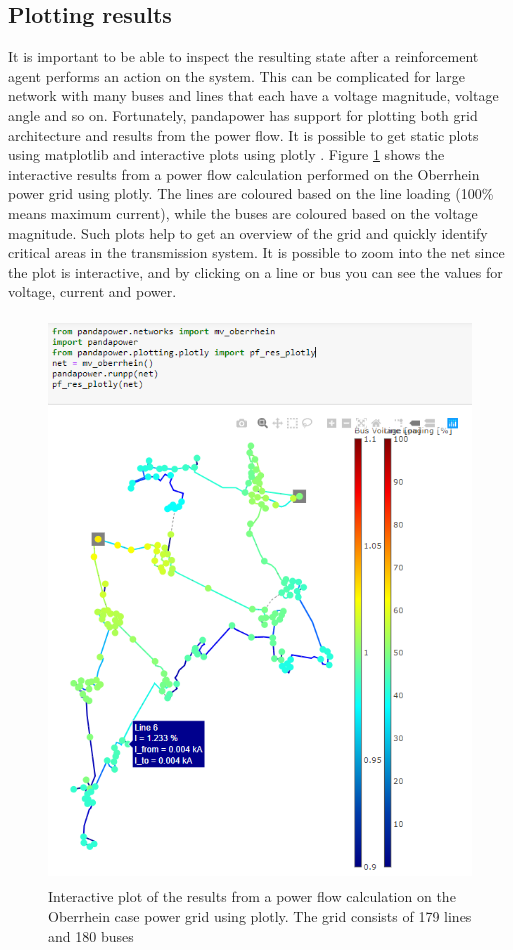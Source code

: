 \documentclass[class=book, crop=false, 11pt]{standalone}
\begin{document}
\subsection{Plotting results}
It is important to be able to inspect the resulting state after a reinforcement agent performs an action on the system. This can be complicated for large network with many buses and lines that each have a voltage magnitude, voltage angle and so on. Fortunately, pandapower has support for plotting both grid architecture and results from the power flow. It is possible to get static plots using matplotlib and interactive plots using plotly \cite{plotly}. Figure \ref{fig:method:oberrhein_grid_results_plotly} shows the interactive results from a power flow calculation performed on the Oberrhein power grid using plotly. The lines are coloured based on the line loading (100\% means maximum current), while the buses are coloured based on the voltage magnitude. Such plots help to get an overview of the grid and quickly identify critical areas in the transmission system. It is possible to zoom into the net since the plot is interactive, and by clicking on a line or bus you can see the values for voltage, current and power.


\begin{figure}[H]
    \center
    \includegraphics[height=15cm, width=12cm]{figures/results_pp_oberrhein.png}
    \caption {Interactive plot of the results from a power flow calculation on the Oberrhein case power grid using plotly. The grid consists of 179 lines and 180 buses}
    \label{fig:method:oberrhein_grid_results_plotly}
\end{figure}
\end{document}
